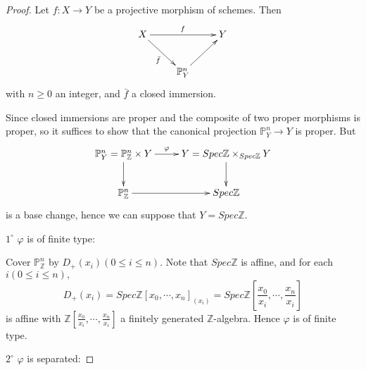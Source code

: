 \begin{proof}
Let $f: X\rightarrow Y$ be a projective morphism of schemes. Then
\[ \xymatrix{
   X \ar[rr]^f \ar[dr]_{\bar{f}} & & Y \\
   & {\mathbb{P}_Y^n} \ar[ur] }  \]
with $n\geqslant 0$ an integer, and $\bar{f}$ a closed immersion.

Since closed immersions are proper and the composite of two proper
morphisms is proper, so it suffices to show that the canonical
projection $\mathbb{P}_Y^n\rightarrow Y$ is proper. But
\[ \xymatrix{
   {\mathbb{P}_Y^n=\mathbb{P}_{\mathbb{Z}}^n\times Y} \ar[d]
   \ar[r]^-{\varphi} & {Y=Spec\mathbb{Z}\times_{Spec\mathbb{Z}} Y} \ar[d] \\
   \mathbb{P}_{\mathbb{Z}}^n \ar[r] & Spec\mathbb{Z} }  \]
is a base change, hence we can suppose that $Y=Spec\mathbb{Z}.$

$\mathit{1^{\circ}}$ $\varphi$ is of finite type:

Cover $\mathbb{P}_{\mathbb{Z}}^n$ by $D_+(x_i)(0\leqslant i\leqslant
n).$ Note that $Spec\mathbb{Z}$ is affine, and for each
$i(0\leqslant i\leqslant n),$
$$D_+(x_i)=Spec\mathbb{Z}[x_0,\cdots,x_n]_{(x_i)}=Spec\mathbb{Z}[\frac{x_0}{x_i},\cdots,\frac{x_n}{x_i}]$$
is affine with $\mathbb{Z}[\frac{x_0}{x_i},\cdots,\frac{x_n}{x_i}]$
a finitely generated $\mathbb{Z}$-algebra. Hence $\varphi$ is of
finite type.

$\mathit{2^{\circ}}$ $\varphi$ is separated:


\end{proof}
